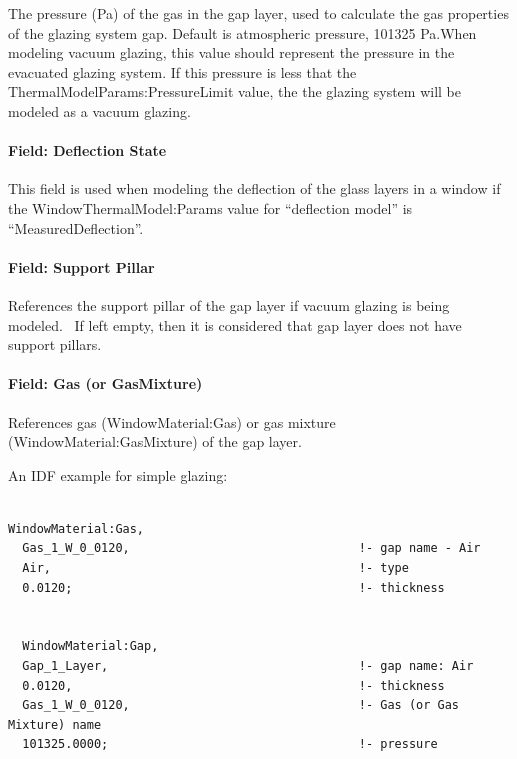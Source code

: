 The pressure (Pa) of the gas in the gap layer, used to calculate the gas properties of the glazing system gap. Default is atmospheric pressure, 101325 Pa.When modeling vacuum glazing, this value should represent the pressure in the evacuated glazing system. If this pressure is less that the ThermalModelParams:PressureLimit value, the the glazing system will be modeled as a vacuum glazing.

\paragraph{Field: Deflection State}\label{field-deflection-state}

This field is used when modeling the deflection of the glass layers in a window if the WindowThermalModel:Params value for ``deflection model'' is ``MeasuredDeflection''.

\paragraph{Field: Support Pillar}\label{field-support-pillar}

References the support pillar of the gap layer if vacuum glazing is being modeled.~ If left empty, then it is considered that gap layer does not have support pillars.

\paragraph{Field: Gas (or GasMixture)}\label{field-gas-or-gasmixture}

References gas (WindowMaterial:Gas) or gas mixture (WindowMaterial:GasMixture) of the gap layer.

An IDF example for simple glazing:

\begin{lstlisting}

WindowMaterial:Gas,
  Gas_1_W_0_0120,                                !- gap name - Air
  Air,                                           !- type
  0.0120;                                        !- thickness


  WindowMaterial:Gap,
  Gap_1_Layer,                                   !- gap name: Air
  0.0120,                                        !- thickness
  Gas_1_W_0_0120,                                !- Gas (or Gas Mixture) name
  101325.0000;                                   !- pressure
\end{lstlisting}

